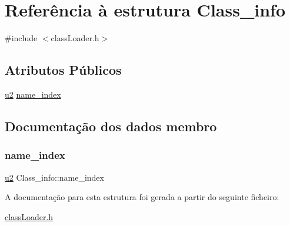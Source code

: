 \hypertarget{struct_class__info}{}\section{Referência à estrutura Class\+\_\+info}
\label{struct_class__info}


{\ttfamily \#include $<$class\+Loader.\+h$>$}

\subsection*{Atributos Públicos}
\begin{DoxyCompactItemize}
\item 
\hyperlink{util_8h_a55ef8d87fd202b8417704c089899c5b9}{u2} \hyperlink{struct_class__info_a49de637ce40fde20825a7b39f0aedee1}{name\+\_\+index}
\end{DoxyCompactItemize}


\subsection{Documentação dos dados membro}
\mbox{\label{struct_class__info_a49de637ce40fde20825a7b39f0aedee1}} 
\subsubsection{\texorpdfstring{name\+\_\+index}{name\_index}}
{\footnotesize\ttfamily \hyperlink{util_8h_a55ef8d87fd202b8417704c089899c5b9}{u2} Class\+\_\+info\+::name\+\_\+index}



A documentação para esta estrutura foi gerada a partir do seguinte ficheiro\+:\begin{DoxyCompactItemize}
\item 
\hyperlink{class_loader_8h}{class\+Loader.\+h}\end{DoxyCompactItemize}
